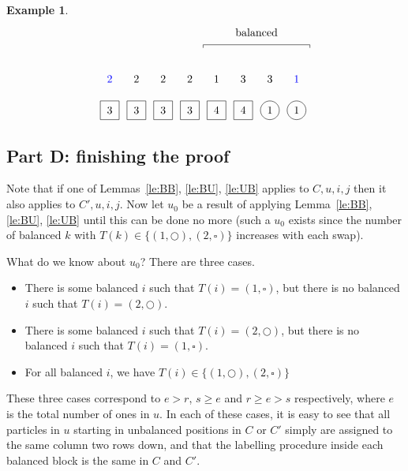 \documentclass[reqno]{amsart}
\newcommand{\0}{\phantom{c}}
\theoremstyle{plain}
\theoremstyle{definition}
\newtheorem{example}[thm]{Example}
\numberwithin{equation}{section}
\begin{document}
\begin{example}
\[\begin{tikzpicture}[baseline=25]
  \node[color=blue] at (8*\sc,\ll) {$1$};
  \node[color=blue] at (1*\sc,\ll) {$2$};
  \foreach \i in {5} { \node at (\i*\sc,\ll) {$1$}; }
  \foreach \i in {2,3,4} { \node at (\i*\sc,\ll) {$2$}; }
  \foreach \i in {6,7} { \node at (\i*\sc,\ll) {$3$}; }
  \foreach \i in {7,8} { \draw (\i*\sc,\l) circle (0.3); }
  \foreach \i in {1,2,3,4,5,6} { \draw (\i*\sc-.3,\l-.3) rectangle +(0.6,+0.6); }
  \foreach \i in {5,6} { \node at (\i*\sc,\l) {$4$}; }
  \foreach \i in {7,8} { \node at (\i*\sc,\l) {$1$}; }
  \foreach \i in {1,2,3,4} { \node at (\i*\sc,\l) {$3$}; }
  \draw (4.5*\sc,3) -- (4.5*\sc,3.1) -- (8.5*\sc,3.1) -- (8.5*\sc,3);
  \node at (6.5*\sc,3.5) {balanced};
\end{tikzpicture}
\]
\end{example}


\subsection*{Part D: finishing the proof}

Note that if one of Lemmas~\ref{le:BB}, \ref{le:BU}, \ref{le:UB} applies to $C,u,i,j$ then it also applies to $C',u,i,j$. Now let $u_0$ be a result of applying Lemma~\ref{le:BB}, \ref{le:BU}, \ref{le:UB} until this can be done no more (such a $u_0$ exists since the number of balanced $k$ with $T(k) \in \{(1,\bigcirc), (2,\square)\}$ increases with each swap).

What do we know about $u_0$? There are three cases.

\begin{itemize}
\item There is some balanced $i$ such that $T(i) = (1, \square)$, but there is no balanced $i$ such that $T(i) = (2,\bigcirc)$.
\item There is some balanced $i$ such that $T(i) = (2, \bigcirc)$, but there is no balanced $i$ such that $T(i) = (1,\square)$.
\item For all balanced $i$, we have $T(i) \in \{(1,\bigcirc),(2,\square)\}$
\end{itemize}

These three cases correspond to $e > r$, $s \geq e$ and $r \geq e > s$ respectively, where $e$ is the total number of ones in $u$. In each of these cases, it is easy to see that all particles in $u$ starting in unbalanced positions in $C$ or $C'$ simply are assigned to the same column two rows down, and that the labelling procedure inside each balanced block is the same in $C$ and $C'$.
\end{document}

